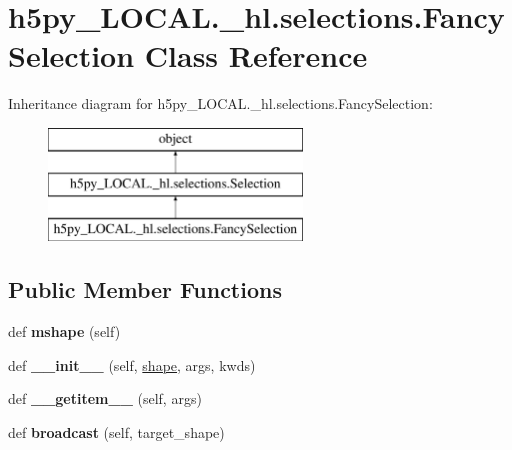 \hypertarget{classh5py__LOCAL_1_1__hl_1_1selections_1_1FancySelection}{}\section{h5py\+\_\+\+L\+O\+C\+A\+L.\+\_\+hl.\+selections.\+Fancy\+Selection Class Reference}
\label{classh5py__LOCAL_1_1__hl_1_1selections_1_1FancySelection}
Inheritance diagram for h5py\+\_\+\+L\+O\+C\+A\+L.\+\_\+hl.\+selections.\+Fancy\+Selection\+:\begin{figure}[H]
\begin{center}
\leavevmode
\includegraphics[height=3.000000cm]{classh5py__LOCAL_1_1__hl_1_1selections_1_1FancySelection}
\end{center}
\end{figure}
\subsection*{Public Member Functions}
\begin{DoxyCompactItemize}
\item 
\mbox{\label{classh5py__LOCAL_1_1__hl_1_1selections_1_1FancySelection_acdfb519d3b5960d5cd82d95ed6027ea9}} 
def {\bfseries mshape} (self)
\item 
\mbox{\label{classh5py__LOCAL_1_1__hl_1_1selections_1_1FancySelection_aa4921b94af79fc3f167c6c99238c362e}} 
def {\bfseries \+\_\+\+\_\+init\+\_\+\+\_\+} (self, \hyperlink{classh5py__LOCAL_1_1__hl_1_1selections_1_1Selection_ac3b41d10d9a5838904dbad4de6428eac}{shape}, args, kwds)
\item 
\mbox{\label{classh5py__LOCAL_1_1__hl_1_1selections_1_1FancySelection_af9d7b312ce1eef4e003ba70c4c951fb3}} 
def {\bfseries \+\_\+\+\_\+getitem\+\_\+\+\_\+} (self, args)
\item 
\mbox{\label{classh5py__LOCAL_1_1__hl_1_1selections_1_1FancySelection_a8563bf9253eafee6be0534504b30fa38}} 
def {\bfseries broadcast} (self, target\+\_\+shape)
\end{DoxyCompactItemize}



